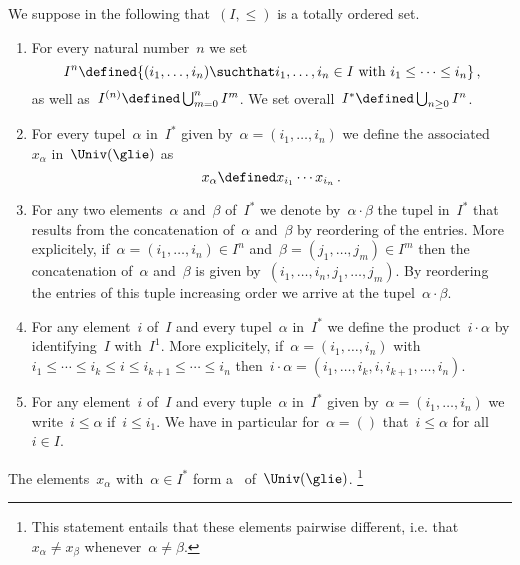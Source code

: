 \begin{convention}
	We suppose in the following that~$(I, \leq)$ is a totally ordered set.
	\begin{enumerate}
		\item
			For every natural number~$n$ we set
			\[
				I^n
				\defined
				\{
					(i_1, \dotsc, i_n)
				\suchthat
					\text{$i_1, \dotsc, i_n \in I$ with~$i_1 \leq \dotsb \leq i_n$}
				\} \,,
			\]
			as well as~$I^{(n)} \defined \bigcup_{m=0}^n I^m$.
			We set overall~$I^* \defined \bigcup_{n \geq 0} I^n$.
		\item
			For every tupel~$\alpha$ in~$I^*$ given by~$\alpha = (i_1, \dotsc, i_n)$ we define the associated ~$x_\alpha$ in~$\Univ(\glie)$ as
			\[
				x_\alpha
				\defined
				x_{i_1} \dotsm x_{i_n}  \,.
			\]
		\item  
			For any two elements~$\alpha$ and~$\beta$ of~$I^*$ we denote by~$\alpha \cdot \beta$ the tupel in~$I^*$ that results from the concatenation of~$\alpha$ and~$\beta$ by reordering of the entries.
			More explicitely, if~$\alpha = (i_1, \dotsc, i_n) \in I^n$ and~$\beta = (j_1, \dotsc, j_m) \in I^m$ then the concatenation of~$\alpha$ and~$\beta$ is given by~$(i_1, \dotsc, i_n, j_1, \dotsc, j_m)$.
			By reordering the entries of this tuple increasing order we arrive at the tupel~$\alpha \cdot \beta$.
		\item
			For any element~$i$ of~$I$ and every tupel~$\alpha$ in~$I^*$ we define the product~$i \cdot \alpha$ by identifying~$I$ with~$I^1$.
			More explicitely, if~$\alpha = (i_1, \dotsc, i_n)$ with~$i_1 \leq \dotsb \leq i_k \leq i \leq i_{k+1} \leq \dotsb \leq i_n$ then~$i \cdot \alpha = (i_1, \dotsc, i_k, i, i_{k+1}, \dotsc, i_n)$.
		\item
			For any element~$i$ of~$I$ and every tuple~$\alpha$ in~$I^*$ given by~$\alpha = (i_1, \dotsc, i_n)$ we write~$i \leq \alpha$ if~$i \leq i_1$.
			We have in particular for~$\alpha = ()$ that~$i \leq \alpha$ for all~$i \in I$.
	\end{enumerate}
\end{convention}


\begin{theorem}
	\label{pbw concrete}
	The elements~$x_\alpha$ with~$\alpha \in I^*$ form a~{\basis{$\kf$}} of~$\Univ(\glie)$.%
	\footnote{This statement entails that these elements pairwise different, i.e. that~$x_\alpha \neq x_\beta$ whenever~$\alpha \neq \beta$.}
\end{theorem}


